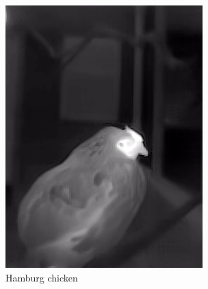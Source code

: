 \documentclass{l4proj}
\begin{document}
\begin{figure}[ht]
\begin{subfigure}[h!]{0.18\textwidth}
    \includegraphics[width=\textwidth, trim={0cm 1.6cm 0cm 1.6cm}, clip]{images/dataset/pretty_chicken/lwir.png}
    \caption{Hamburg chicken}
  \end{subfigure}
  \\
  \vspace*{3mm}
  \begin{subfigure}[h!]{0.18\textwidth}

\end{subfigure}
\end{figure}
\end{document}
